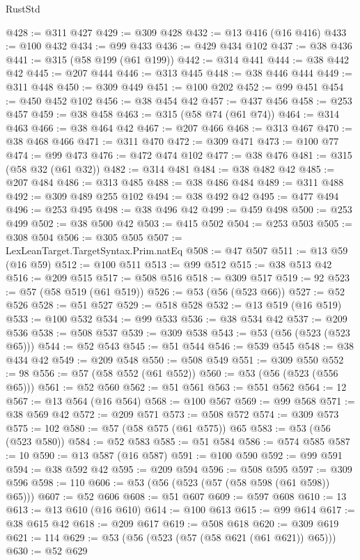 \begin{lexlean}{RustStd}
\begin{coremodule}
@428 := @311 @427
@429 := @309 @428
@432 := @13 @416 (@16 @416)
@433 := @100 @432
@434 := @99 @433
@436 := @429 @434 @102
@437 := @38 @436
@441 := @315 (@58 @199 (@61 @199))
@442 := @314 @441
@444 := @38 @442 @42
@445 := @207 @444
@446 := @313 @445
@448 := @38 @446 @444
@449 := @311 @448
@450 := @309 @449
@451 := @100 @202
@452 := @99 @451
@454 := @450 @452 @102
@456 := @38 @454 @42
@457 := @437 @456
@458 := @253 @457
@459 := @38 @458
@463 := @315 (@58 @74 (@61 @74))
@464 := @314 @463
@466 := @38 @464 @42
@467 := @207 @466
@468 := @313 @467
@470 := @38 @468 @466
@471 := @311 @470
@472 := @309 @471
@473 := @100 @77
@474 := @99 @473
@476 := @472 @474 @102
@477 := @38 @476
@481 := @315 (@58 @32 (@61 @32))
@482 := @314 @481
@484 := @38 @482 @42
@485 := @207 @484
@486 := @313 @485
@488 := @38 @486 @484
@489 := @311 @488
@492 := @309 @489 @255 @102
@494 := @38 @492 @42
@495 := @477 @494
@496 := @253 @495
@498 := @38 @496 @42
@499 := @459 @498
@500 := @253 @499
@502 := @38 @500 @42
@503 := @415 @502
@504 := @253 @503
@505 := @308 @504
@506 := @305 @505
@507 := LexLeanTarget.TargetSyntax.Prim.natEq
@508 := @47 @507
@511 := @13 @59 (@16 @59)
@512 := @100 @511
@513 := @99 @512
@515 := @38 @513 @42
@516 := @209 @515
@517 := @508 @516
@518 := @309 @517
@519 := 92
@523 := @57 (@58 @519 (@61 @519))
@526 := @53 (@56 (@523 @66))
@527 := @52 @526
@528 := @51 @527
@529 := @518 @528
@532 := @13 @519 (@16 @519)
@533 := @100 @532
@534 := @99 @533
@536 := @38 @534 @42
@537 := @209 @536
@538 := @508 @537
@539 := @309 @538
@543 := @53 (@56 (@523 (@523 @65)))
@544 := @52 @543
@545 := @51 @544
@546 := @539 @545
@548 := @38 @434 @42
@549 := @209 @548
@550 := @508 @549
@551 := @309 @550
@552 := 98
@556 := @57 (@58 @552 (@61 @552))
@560 := @53 (@56 (@523 (@556 @65)))
@561 := @52 @560
@562 := @51 @561
@563 := @551 @562
@564 := 12
@567 := @13 @564 (@16 @564)
@568 := @100 @567
@569 := @99 @568
@571 := @38 @569 @42
@572 := @209 @571
@573 := @508 @572
@574 := @309 @573
@575 := 102
@580 := @57 (@58 @575 (@61 @575)) @65
@583 := @53 (@56 (@523 @580))
@584 := @52 @583
@585 := @51 @584
@586 := @574 @585
@587 := 10
@590 := @13 @587 (@16 @587)
@591 := @100 @590
@592 := @99 @591
@594 := @38 @592 @42
@595 := @209 @594
@596 := @508 @595
@597 := @309 @596
@598 := 110
@606 := @53 (@56 (@523 (@57 (@58 @598 (@61 @598)) @65)))
@607 := @52 @606
@608 := @51 @607
@609 := @597 @608
@610 := 13
@613 := @13 @610 (@16 @610)
@614 := @100 @613
@615 := @99 @614
@617 := @38 @615 @42
@618 := @209 @617
@619 := @508 @618
@620 := @309 @619
@621 := 114
@629 := @53 (@56 (@523 (@57 (@58 @621 (@61 @621)) @65)))
@630 := @52 @629

\end{coremodule}
\end{lexlean}
